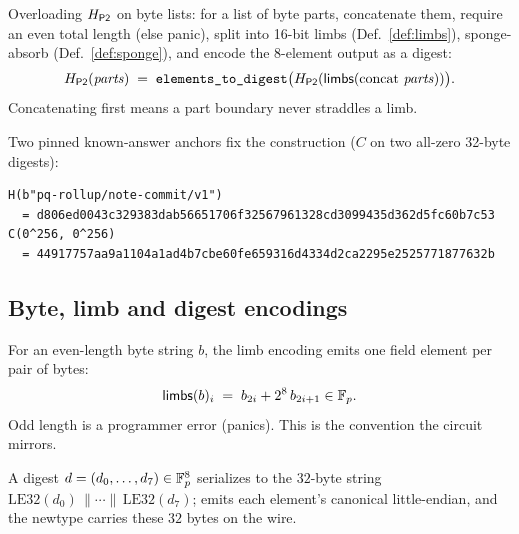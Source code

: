 \begin{definition}
\label{def:bytehash}
Overloading $H_{\mathsf{P2}}$ on byte lists: for a list of byte parts, concatenate them,
require an even total length (else panic), split into 16-bit limbs
(Def.~\ref{def:limbs}), sponge-absorb (Def.~\ref{def:sponge}), and encode the
$8$-element output as a digest:
\[
  \Hp(\mathit{parts}) \;=\; \code{elements\_to\_digest}\big(\Hp(\limbs(\mathrm{concat}\ \mathit{parts}))\big).
\]
Concatenating first means a part boundary never straddles a limb.
\end{definition}

Two pinned known-answer anchors fix the construction ($C$ on two all-zero 32-byte
digests):
\begin{Verbatim}[fontsize=\small]
H(b"pq-rollup/note-commit/v1")
  = d806ed0043c329383dab56651706f32567961328cd3099435d362d5fc60b7c53
C(0^256, 0^256)
  = 44917757aa9a1104a1ad4b7cbe60fe659316d4334d2ca2295e2525771877632b
\end{Verbatim}

\subsection{Byte, limb and digest encodings}
\label{subsec:digest-enc}

\begin{definition}
\label{def:limbs}
For an even-length byte string $b$, the limb encoding emits one field element per
pair of bytes:
\[
  \mathsf{limbs}(b)_i \;=\; b_{2i} + 2^8\, b_{2i+1} \in \mathbb{F}_p .
\]
Odd length is a programmer error (panics). This is the 
 convention the circuit mirrors.
\end{definition}

\begin{definition}
A digest $d=(d_0,\dots,d_7)\in\mathbb{F}_p^8$ serializes to the $32$-byte string
$\mathrm{LE32}(d_0)\,\|\cdots\|\,\mathrm{LE32}(d_7)$; 
emits each element's canonical  little-endian, and the 
newtype carries these $32$ bytes on the wire.
\end{definition}

